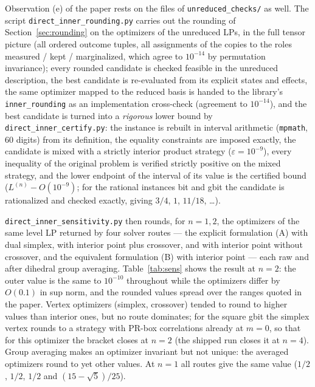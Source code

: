 \documentclass[11pt,a4paper]{article}
\newcommand*{\code}[1]{\texttt{#1}}
\theoremstyle{remark}
\begin{document}
Observation (e) of the paper rests on the files of
\code{unreduced\_checks/} as well. The script
\code{direct\_inner\_rounding.py} carries out the rounding of
Section~\ref{sec:rounding} on the optimizers of the unreduced LPs, in the
full tensor picture (all ordered outcome tuples, all
assignments of the copies to the roles measured / kept / marginalized,
which agree to $10^{-14}$ by permutation invariance); every rounded
candidate is checked feasible in the unreduced description, the best
candidate is re-evaluated from its explicit states and effects, the same
optimizer mapped to the reduced basis is handed to the library's
\code{inner\_rounding} as an implementation cross-check (agreement to
$10^{-14}$), and the best candidate is turned into a \emph{rigorous} lower
bound by \code{direct\_inner\_certify.py}: the instance is rebuilt in
interval arithmetic (\code{mpmath}, 60 digits) from its definition, the
equality constraints are imposed exactly, the candidate is mixed with a
strictly interior product strategy ($\varepsilon=10^{-9}$), every
inequality of the original problem is verified strictly positive on the
mixed strategy, and the lower endpoint of the interval of its value is the
certified bound ($L^{(n)}-O(10^{-9})$; for the rational instances bit and
gbit the candidate is rationalized and checked exactly, giving $3/4$, $1$,
$11/18$, \ldots).

\code{direct\_inner\_sensitivity.py} then rounds, for $n=1,2$, the
optimizers of the same level LP returned by four solver routes --- the
explicit formulation (A) with dual simplex, with interior point plus
crossover, and with interior point without crossover, and the equivalent
formulation (B) with interior point --- each raw and after dihedral group
averaging. Table~\ref{tab:sens} shows the result at $n=2$: the outer value
is the same to $10^{-10}$ throughout while the optimizers differ by $O(0.1)$
in sup norm, and the rounded values spread over the ranges quoted in the
paper. Vertex optimizers (simplex, crossover) tended to round to higher
values than interior ones, but no route dominates; for the square gbit the
simplex vertex rounds to a strategy with PR-box correlations already at
$m=0$, so that for this optimizer the bracket closes at $n=2$ (the shipped
run closes it at $n=4$). Group averaging makes an optimizer invariant but
not unique: the averaged optimizers round to yet other values. At $n=1$
all routes give the same value ($1/2$, $1/2$, $1/2$ and
$(15-\sqrt5)/25$).
\end{document}
